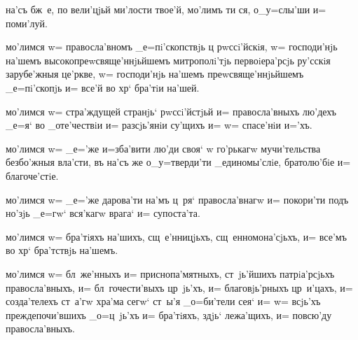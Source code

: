 
 на'съ бж~е, по вели'цjьй ми'лости твое'й, 
мо'лимъ ти ся, о_у=слы'ши и= поми'луй.


 мо'лимся w= правосла'вномъ _е=пi'скопствjь ц 
рwссi'йскiя, w= господи'нjь на'шемъ высокопреwсвяще'ннjьйшемъ 
митрополi'тjь  первоiера'рсjь ру'сскiя 
 зарубе'жныя це'ркве, w= господи'нjь на'шемъ 
преwсвяще'ннjьйшемъ \kinovar{[}{а=рхiепi'скопjь}  _е=пi'скопjь 
\kinovarsimple{и='мярекъ, _е=гw'же _о='бласть]} и= все'й во хр` бра'тiи 
на'шей.


 мо'лимся w= стра'ждущей странjь`  
рwссi'йстjьй и= правосла'вныхъ лю'дехъ _е=я` во _оте'чествiи 
и= разсjь'янiи су'щихъ и= w= спасе'нiи и='хъ.


 мо'лимся w= _е='же и=зба'вити лю'ди своя` w\т 
го'рькагw мучи'тельства безбо'жныя вла'сти, въ на'съ же 
о_у=тверди'ти _единомы'слiе, братолю'бiе и= благоче'стiе.


 мо'лимся w= _е='же дарова'ти на'мъ ц~ря` 
правосла'внагw и= покори'ти подъ но'зjь _е=гw` вся'кагw 
врага` и= супоста'та.


 мо'лимся w= бра'тiяхъ на'шихъ, сщ~е'нницjьхъ, 
сщ~енномона'сjьхъ, и= все'мъ во хр` бра'тствjь 
на'шемъ.


 мо'лимся w= бл~же'нныхъ и= приснопа'мятныхъ, 
ст~jь'йшихъ патрiа'рсjьхъ правосла'вныхъ, и= 
бл~гочести'выхъ цр~jь'хъ, и= благовjь'рныхъ цр~и'цахъ, и= 
созда'телехъ ст~а'гw хра'ма сегw` \kinovarsimple{[и=ли`} ст~ы'я _о=би'тели сея`\kinovar{]}{,} и= w= всjь'хъ 
преждепочи'вшихъ _о=ц~jь'хъ и= бра'тiяхъ, здjь` 
лежа'щихъ, и= повсю'ду правосла'вныхъ.

